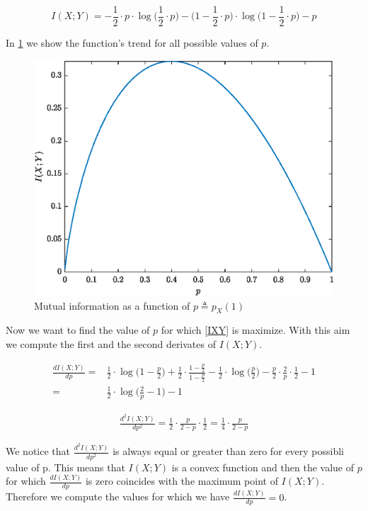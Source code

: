 \begin{equation}
	I(X;Y) = -\frac{1}{2}\cdot p \cdot \log\Big(\frac{1}{2}\cdot p\Big)-\Big(1-\frac{1}{2}\cdot p\Big)\cdot \log \Big(1-\frac{1}{2}\cdot p\Big)-p
	\label{IXY}
\end{equation}

\pagebreak

In \ref{fig:funcinfoex1} we show the function's trend for all possible values of $p$.

\begin{figure}[h!]
	\centering
	\includegraphics[width=0.7\linewidth]{img/func_info_ex1}
	\caption{Mutual information as a function of $p \triangleq p_X(1)$}
	\label{fig:funcinfoex1}
\end{figure}

Now we want to find the value of $p$ for which \eqref{IXY} is maximize. With this aim we compute the first and the second derivates of $I(X;Y)$.

\begin{align*}
	\frac{dI(X;Y)}{dp}= &\frac{1}{2} \cdot \log \Big( 1 - \frac{p}{2}\Big)+ \frac{1}{2} \cdot \frac{1- \frac{p}{2}}{1-\frac{p}{2}} - \frac{1}{2} \cdot \log\Big ( \frac{p}{2}\Big)-\frac{p}{2} \cdot \frac{2}{p} \cdot \frac{1}{2} - 1 \\
	= & \frac{1}{2} \cdot \log \Big ( \frac{2}{p} - 1\Big)-1
\end{align*}

\begin{align*}
	\frac{d^2I(X;Y)}{dp^2}= \frac{1}{2}\cdot \frac{p}{2-p} \cdot \frac{1}{2}= \frac{1}{4} \cdot \frac{p}{2-p}
\end{align*}

We notice that $\frac{d^2I(X;Y)}{dp^2}$ is always equal or greater than zero for every possibli value of p. This means that $I(X;Y)$ is a convex function and then the value of $p$ for which $\frac{dI(X;Y)}{dp}$ is zero coincides with the maximum point of $I(X;Y)$. Therefore we compute the values for which we have $\frac{dI(X;Y)}{dp}=0$.

